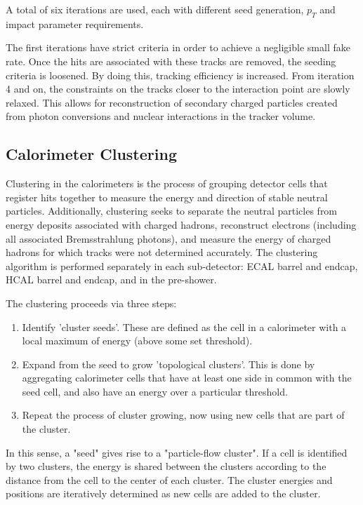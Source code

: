 A total of six iterations are used, each with different seed generation, $p_{T}$ and impact parameter requirements.

The first iterations have strict criteria in order to achieve a negligible small fake rate. Once the hits are associated with these tracks are removed, the seeding criteria is loosened. By doing this, tracking efficiency is increased. From iteration 4 and on, the constraints on the tracks closer to the interaction point are slowly relaxed. This allows for reconstruction of secondary charged particles created from photon conversions and nuclear interactions in the tracker volume.

\subsection{Calorimeter Clustering}
Clustering in the calorimeters is the process of grouping detector cells that register hits together to measure the energy and direction of stable neutral particles. Additionally, clustering seeks to separate the neutral particles from energy deposits associated with charged hadrons, reconstruct electrons (including all associated Bremsstrahlung photons), and measure the energy of charged hadrons for which tracks were not determined accurately. The clustering algorithm is performed separately in each sub-detector: ECAL barrel and endcap, HCAL barrel and endcap, and in the pre-shower.

The clustering proceeds via three steps\cite{CMS:2009nxa}:

\begin{enumerate}
	\item Identify 'cluster seeds'. These are defined as the cell in a calorimeter with a local maximum of energy (above some set threshold).
	\item Expand from the seed to grow 'topological clusters'. This is done by aggregating calorimeter cells that have at least one side in common with the seed cell, and also have an energy over a particular threshold.
	\item Repeat the process of cluster growing, now using new cells that are part of the cluster.
\end{enumerate}

In this sense, a "seed" gives rise to a "particle-flow cluster". If a cell is identified by two clusters, the energy is shared between the clusters according to the distance from the cell to the center of each cluster. The cluster energies and positions are iteratively determined as new cells are added to the cluster.

